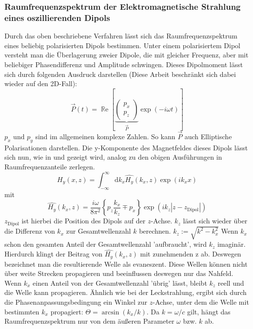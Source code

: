 \documentclass[titlepage]{article}
\renewcommand{\Re}{\operatorname{\mathbb{R}e}}
\begin{document}
	\subsubsection{Raumfrequenzspektrum der Elektromagnetische Strahlung eines oszillierenden Dipols}
		\label{sec:spatial_freq_dip}
	Durch das oben beschriebene Verfahren lässt sich das Raumfrequenzspektrum eines beliebig polarisierten Dipols bestimmen. Unter einem polarisiertem Dipol versteht man die Überlagerung zweier Dipole, die mit gleicher Frequenz, aber mit beliebiger Phasendifferenz und Amplitude schwingen. Dieses Dipolmoment lässt sich durch folgenden Ausdruck darstellen (Diese Arbeit beschränkt sich dabei wieder auf den 2D-Fall): 
		$$\vec{P}(t)= \Re\left[\underbrace{\begin{pmatrix} p_x \\ p_z \end{pmatrix}}_{\vec{P}} \exp(-i\omega t)\right]$$
		$p_x$ und $p_y$ sind im allgemeinen komplexe Zahlen. So kann $\vec{P}$ auch Elliptische Polarisationen darstellen. Die y-Komponente des Magnetfeldes dieses Dipols lässt sich nun, wie in \cite{Novotny.2012b} und \cite{RodriguezFortuno.2013} gezeigt wird, analog zu den obigen Ausführungen in Raumfrequenzanteile zerlegen.
		\begin{equation}
			H_y(x, z) = \int_{-\infty}^{\infty}\mathrm{d}k_x\hat{H_y}(k_x, z)\exp(ik _xx) 
		\end{equation}
		mit
		\begin{equation}
			\label{eq:spatial_freq_dip}
			\boxed{\hat{H_y}(k_x, z) = \dfrac{i\omega}{8\pi^2}\left\{p_z\dfrac{k_x}{k_z} \mp p_x\right\}\exp(ik_z|z-z_{\mathrm{Dipol}}|)}
		\end{equation}
	$z_{\mathrm{Dipol}}$ ist hierbei die Position des Dipols auf der $z$-Achse. $k_z$ lässt sich wieder über die Differenz von $k_x$ zur Gesamtwellenzahl $k$ berechnen. $k_z := \sqrt{k^2-k_x^2}$ Wenn $k_x$ schon den gesamten Anteil der Gesamtwellenzahl 'aufbraucht',  wird $k_z$ imaginär. Hierdurch klingt der Beitrag von $\hat{H_y}(k_x, z)$ mit zunehmenden z ab. Deswegen bezeichnet man die resultierende Welle als evaneszent. Diese Wellen können nicht über weite Strecken propagieren und beeinflussen deswegen nur das Nahfeld. Wenn $k_x$ einen Anteil von der Gesamtwellenzahl 'übrig' lässt, bleibt $k_z$ reell und die Welle kann propagieren. Ähnlich wie bei der Leckstrahlung, ergibt sich durch die Phasenanpassungsbedingung ein Winkel zur $z$-Achse, unter dem die Welle mit bestimmten $k_x$ propagiert: $\Theta = \arcsin(k_x/k)$. Da $k = \omega / c$ gilt, hängt das Raumfrequenzspektrum nur von dem äußeren Parameter $\omega$ bzw. $k$ ab. 
\end{document}
